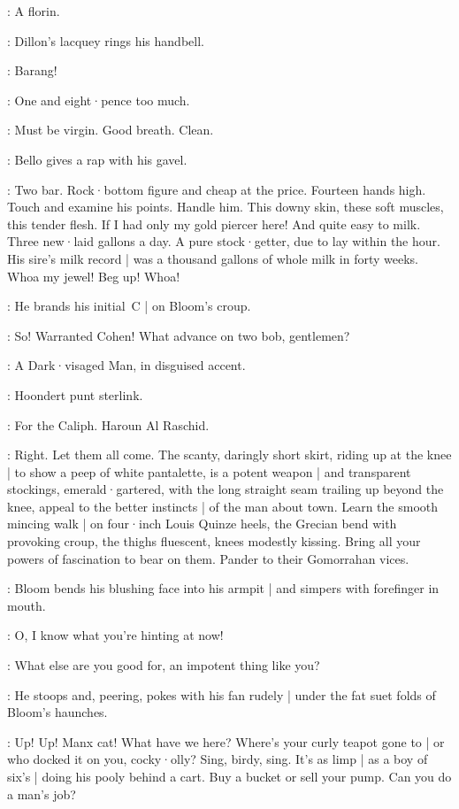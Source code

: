 \Bidder:
A florin.

:
Dillon's lacquey rings his handbell.

\Lacquey:
Barang!

\Voice:
One and eight·pence too much.

\Marsh[2]:
Must be virgin.
Good breath.
Clean.

:
Bello gives a rap with his gavel.

\Bello:
Two bar.
Rock·bottom figure and cheap at the price.
Fourteen hands high.
Touch and examine his points.
Handle him.
This downy skin,
these soft muscles,
this tender flesh.
If I had only my gold piercer here!
And quite easy to milk.
Three new·laid gallons a day.
A pure stock·getter,
due to lay within the hour.
His sire's milk record |
was a thousand gallons of whole milk in forty weeks.
Whoa my jewel!
Beg up!
Whoa!

:
He brands his initial~C |
on Bloom's croup.

\Bello:
So!
Warranted Cohen!
What advance on two bob,
gentlemen?

:
A Dark·visaged Man,
in disguised accent.

\DarkvisagedMan:
Hoondert punt sterlink.

\Voices:
For the Caliph.
Haroun Al Raschid.

\Bello:
Right.
Let them all come.
The scanty,
daringly short skirt,
riding up at the knee |
to show a peep of white pantalette,
is a potent weapon |
and transparent stockings,
emerald·gartered,
with the long straight seam trailing up beyond the knee,
appeal to the better instincts |
of the  man about town.
Learn the smooth mincing walk |
on four·inch Louis Quinze heels,
the Grecian bend with provoking croup,
%
the thighs fluescent,
knees modestly kissing.
Bring all your powers of fascination to bear on them.
Pander to their Gomorrahan vices.

:
Bloom bends his blushing face into his armpit |
and simpers with forefinger in mouth.

\Bloom:
O,
I know what you're hinting at now!

\Bello:
What else are you good for,
an impotent thing like you?

:
He stoops and,
peering,
pokes with his fan rudely |
under the fat suet folds of Bloom's haunches.

\Bello:
Up! Up!
Manx cat!
What have we here?
Where's your curly teapot gone to |
or who docked it on you,
cocky·olly?
Sing,
birdy,
sing.
%
It's as limp |
as a boy of six's |
doing his pooly behind a cart.
Buy a bucket or sell your pump.
Can you do a man's job?

